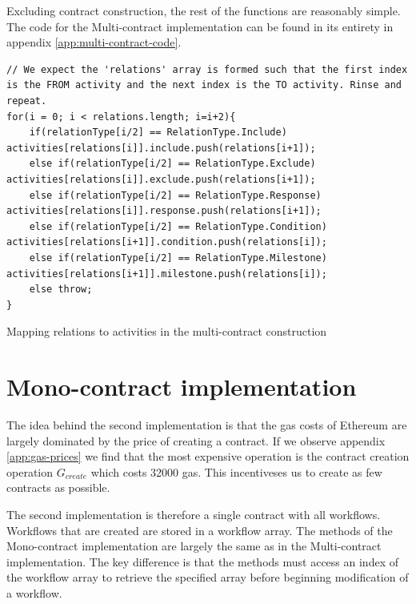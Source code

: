 \documentclass{article}
\begin{document}
		Excluding contract construction, the rest of the functions are reasonably simple.
		The code for the Multi-contract implementation can be found in its entirety in appendix \ref{app:multi-contract-code}.

		\begin{snippet}[!ht]
			\centering
			\begin{lstlisting}[language=solidity, numbers=none]
// We expect the 'relations' array is formed such that the first index is the FROM activity and the next index is the TO activity. Rinse and repeat.
for(i = 0; i < relations.length; i=i+2){
    if(relationType[i/2] == RelationType.Include)        	activities[relations[i]].include.push(relations[i+1]);
    else if(relationType[i/2] == RelationType.Exclude)   	activities[relations[i]].exclude.push(relations[i+1]);
    else if(relationType[i/2] == RelationType.Response)  	activities[relations[i]].response.push(relations[i+1]);
    else if(relationType[i/2] == RelationType.Condition) 	activities[relations[i+1]].condition.push(relations[i]);
    else if(relationType[i/2] == RelationType.Milestone) 	activities[relations[i+1]].milestone.push(relations[i]);
    else throw;
}			
			\end{lstlisting}
		 	\caption[Mapping relations to activities in the multi-contract construction]
		 	{Mapping relations to activities in the multi-contract construction}
		 	\label{sni:relation-mapping}
		\end{snippet}

	\section{Mono-contract implementation}
	The idea behind the second implementation is that the gas costs of Ethereum are largely dominated by the price of creating a contract. If we observe appendix \ref{app:gas-prices} we find that the most expensive operation is the contract creation operation $G_{create}$ which costs 32000 gas. 
	This incentiveses us to create as few contracts as possible. 

	The second implementation is therefore a single contract with all workflows. 
	Workflows that are created are stored in a workflow array. 
	The methods of the Mono-contract implementation are largely the same as in the Multi-contract implementation. 
	The key difference is that the methods must access an index of the workflow array to retrieve the specified array before beginning modification of a workflow.
\end{document}
